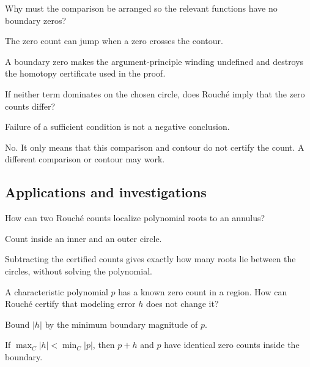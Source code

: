 \begin{exercise}\label{exr:iv13-expand-11}
Why must the comparison be arranged so the relevant functions have no boundary zeros?
\end{exercise}
\begin{hint}
The zero count can jump when a zero crosses the contour.
\end{hint}
\begin{solution}
A boundary zero makes the argument-principle winding undefined and destroys the homotopy certificate used in the proof.
\end{solution}

\begin{exercise}\label{exr:iv13-expand-12}
If neither term dominates on the chosen circle, does Rouché imply that the zero counts differ?
\end{exercise}
\begin{hint}
Failure of a sufficient condition is not a negative conclusion.
\end{hint}
\begin{solution}
No. It only means that this comparison and contour do not certify the count. A different comparison or contour may work.
\end{solution}

\subsection*{Applications and investigations}

\begin{exercise}\label{exr:iv13-expand-13}
How can two Rouché counts localize polynomial roots to an annulus?
\end{exercise}
\begin{hint}
Count inside an inner and an outer circle.
\end{hint}
\begin{solution}
Subtracting the certified counts gives exactly how many roots lie between the circles, without solving the polynomial.
\end{solution}

\begin{exercise}\label{exr:iv13-expand-14}
A characteristic polynomial \(p\) has a known zero count in a region. How can Rouché certify that modeling error \(h\) does not change it?
\end{exercise}
\begin{hint}
Bound \(|h|\) by the minimum boundary magnitude of \(p\).
\end{hint}
\begin{solution}
If \(\max_C|h|<\min_C|p|\), then \(p+h\) and \(p\) have identical zero counts inside the boundary.
\end{solution}

